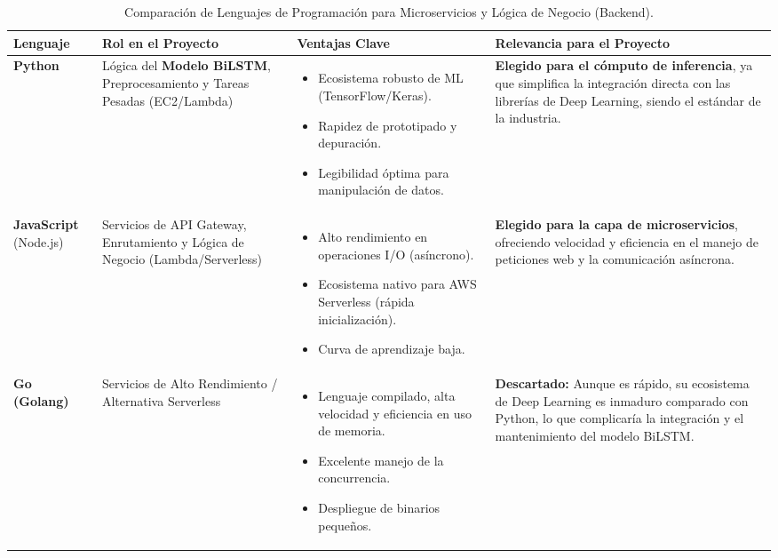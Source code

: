 \begin{table}[H]
    \centering
    \caption{Comparación de Lenguajes de Programación para Microservicios y Lógica de Negocio (Backend).}
    \label{tabla_comparativa_backend}
    \begin{tabular}{|p{1.8cm}|p{3.5cm}|p{5cm}|p{6cm}|}
        \hline
        \textbf{Lenguaje} & \textbf{Rol en el Proyecto} & \textbf{Ventajas Clave} & \textbf{Relevancia para el Proyecto} \\
        \hline
        \textbf{Python} &
        Lógica del \textbf{Modelo BiLSTM}, Preprocesamiento y Tareas Pesadas (EC2/Lambda) &
        \begin{itemize}[nosep, itemsep=0pt]
            \item Ecosistema robusto de ML (TensorFlow/Keras).
            \item Rapidez de prototipado y depuración.
            \item Legibilidad óptima para manipulación de datos.
        \end{itemize} &
        \textbf{Elegido para el cómputo de inferencia}, ya que simplifica la integración directa con las librerías de Deep Learning, siendo el estándar de la industria. \\
        \hline
        \textbf{JavaScript} \newline (Node.js) &
        Servicios de API Gateway, Enrutamiento y Lógica de Negocio (Lambda/Serverless) &
        \begin{itemize}[nosep, itemsep=0pt]
            \item Alto rendimiento en operaciones I/O (asíncrono).
            \item Ecosistema nativo para AWS Serverless (rápida inicialización).
            \item Curva de aprendizaje baja.
        \end{itemize} &
        \textbf{Elegido para la capa de microservicios}, ofreciendo velocidad y eficiencia en el manejo de peticiones web y la comunicación asíncrona. \\
        \hline
        \textbf{Go (Golang)} &
        Servicios de Alto Rendimiento / Alternativa Serverless &
        \begin{itemize}[nosep, itemsep=0pt]
            \item Lenguaje compilado, alta velocidad y eficiencia en uso de memoria.
            \item Excelente manejo de la concurrencia.
            \item Despliegue de binarios pequeños.
        \end{itemize} &
        \textbf{Descartado:} Aunque es rápido, su ecosistema de Deep Learning es inmaduro comparado con Python, lo que complicaría la integración y el mantenimiento del modelo BiLSTM. \\
        \hline
    \end{tabular}
\end{table}

